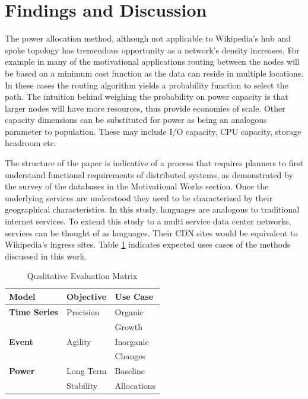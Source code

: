 \documentclass[conference]{IEEEtran}
\begin{document}
\section{Findings and Discussion}

The power allocation method, although not applicable to Wikipedia's hub and spoke topology has tremendous opportunity as a network's density increases. For example in many of the motivational applications routing between the nodes will be based on a minimum cost function as the data can reside in multiple locations. In these cases the routing algorithm yields a probability function to select the path. The intuition behind weighing the probability on power capacity is that larger nodes will have more resources, thus provide economies of scale. Other capacity dimensions can be substituted for power as being an analogous parameter to population.  These may include I/O capacity, CPU capacity, storage headroom etc.

The structure of the paper is indicative of a process that requires planners to first understand functional requirements of distributed systems, as demonstrated by the survey of the databases in the Motivational Works section. Once the underlying services are understood they need to be characterized by their geographical characteristics. In this study, languages are analogous to traditional internet services. To extend this study to a multi service data center networks, services can be thought of as languages. Their CDN sites would be equivalent to Wikipedia's ingress sites. Table \ref{qualitative_comps} indicates expected uses cases of the methods discussed in this work.


\begin{table}[htbp]
\caption{Qualitative Evaluation Matrix}
\begin{center}
\begin{tabular}{l|l|l}

\textbf{Model}        &     \textbf{Objective}    & \textbf{Use Case}\\
	\hline\hline
	
\textbf{Time Series}  &      Precision            & Organic          \\
                      &                           & Growth           \\
\textbf{Event}        &      Agility              & Inorganic       \\
                      &                           & Changes          \\
\textbf{Power}        &      Long Term            & Baseline         \\
                      &      Stability            & Allocations        \\
                      
\end{tabular}
\label{qualitative_comps}
\end{center}
\end{table}
\end{document}
